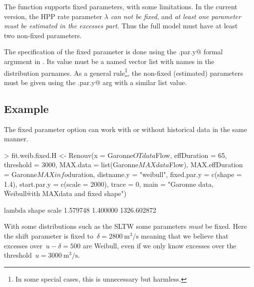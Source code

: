 \documentclass[a4paper]{report}
\begin{document}
The \verb@Renouv@ function supports fixed parameters, with some limitations. 
In the current version, the HPP rate parameter \textit{$\lambda$ can not
be fixed}, and \textit{at least one parameter must be estimated
in the excesses part}. Thus the full model must have at least two
non-fixed parameters.

The specification of the fixed parameter is done using the 
\verb@fixed.par.y@ formal argument in \verb@Renouv@. Its value
must be a named vector list with names in the distribution parnames.
As a general rule\footnote{In some special cases, this is unnecessary
but harmless.}, 
the non-fixed (estimated) parameters must
be given using the \verb@start.par.y@ arg with a similar
list value.

\subsection{Example}
The fixed parameter option can work with or without 
historical data in the same manner.

\begin{Schunk}
\begin{Sinput}
> fit.weib.fixed.H <- 
    Renouv(x = Garonne$OTdata$Flow,
           effDuration = 65, threshold = 3000,
           MAX.data = list(Garonne$MAXdata$Flow),
           MAX.effDuration = Garonne$MAXinfo$duration,
           distname.y = "weibull",
           fixed.par.y = c(shape = 1.4),
           start.par.y = c(scale = 2000),
           trace = 0,
           main = "Garonne data, \"Weibull\" with MAXdata and fixed shape")
\end{Sinput}
\end{Schunk}
\begin{Schunk}
\begin{Soutput}
     lambda       shape       scale 
   1.579748    1.400000 1326.602872 
\end{Soutput}
\end{Schunk}

\noindent
With some distributions such as the SLTW some parameters \textit{must}
be fixed.  Here the shift parameter \verb@delta@ is fixed 
to~$~\textrm{m}^3/\textrm{s}$ meaning that we 
believe that excesses over~$u-$ are Weibull, 
even if we only know excesses over the 
threshold~$u=3000~\textrm{m}^3/\textrm{s}$.
\end{document}
